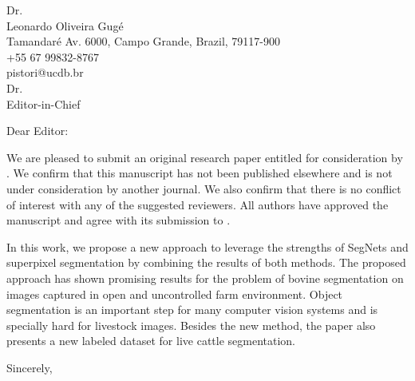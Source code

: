 \documentclass[11pt]{letter}
\begin{document}
\begin{letter}{
    Dr. \nomeAutor\\
    Leonardo Oliveira Gugé\\
	Tamandaré Av. 6000, Campo Grande, Brazil, 79117-900\\
    +55 67 99832-8767\\
    pistori@ucdb.br\\
    \medskip
    Dr. \nomeEditor \\
    Editor-in-Chief\\
    \textit{\nomeRevista}
  }
  \signature{
    Dr. \nomeAutor\\
  }
  \opening{Dear Editor:}

We are pleased to submit an original research paper entitled \textbf{\nomeArtigo} for consideration by \nomeRevista. We confirm that this manuscript has not been published elsewhere and is not under consideration by another journal. We also confirm that there is no conflict of interest with any of the suggested reviewers. All authors have approved the manuscript and agree with its submission to \textbf{\nomeRevista}.
		
In this work, we propose a new approach to leverage the strengths of SegNets and superpixel segmentation by combining the results of both methods. The proposed approach has shown promising results for the problem of bovine segmentation on images captured in open and uncontrolled farm environment. Object segmentation is an important step for many computer vision systems and is specially hard for livestock images. Besides the new method, the paper also presents a new labeled dataset for live cattle segmentation. 

  \closing{Sincerely,}
\end{letter}
\end{document}
